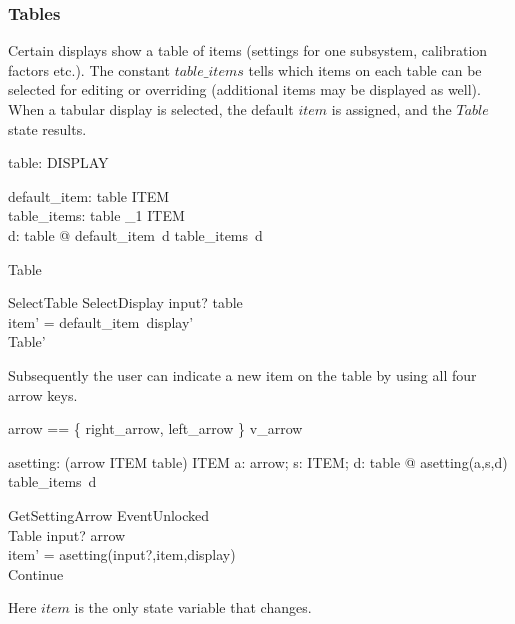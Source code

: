 \documentclass{article}
\begin{document}
\subsubsection{Tables}

Certain displays show a table of items (settings for one subsystem,
calibration factors etc.).  The constant $table\_items$ tells which
items on each table can be selected for editing or overriding
(additional items may be displayed as well).  When a tabular display
is selected, the default $item$ is assigned, and the $Table$ state
results.

\begin{axdef}
	table: \power DISPLAY
\end{axdef}

\begin{axdef}
	default\_item: table \fun ITEM \\
	table\_items: table \fun \power_1 ITEM \\
\where 
	\forall d: table @ default\_item~d \in table\_items~d
\end{axdef}


\begin{zed}
Table 
\end{zed}

\begin{schema}{SelectTable}
	SelectDisplay
\where
	input? \in table \\
	item' = default\_item~display' \\
	Table'
\end{schema}
Subsequently the user can indicate a new item on the table by using
all four arrow keys.

\begin{zed} arrow == \{ right\_arrow, left\_arrow \} \cup v\_arrow \end{zed}

\begin{axdef}
	asetting: (arrow \cross ITEM \cross table) \fun ITEM
\where
	\forall a: arrow; s: ITEM; d: table @ asetting(a,s,d) \in table\_items~d
\end{axdef}

\begin{schema}{GetSettingArrow}
	EventUnlocked \\
	\Delta Table
\where
	input? \in arrow \\
	item' = asetting(input?,item,display) \\
	Continue
\end{schema}
Here $item$ is the only state variable that changes.
\end{document}
